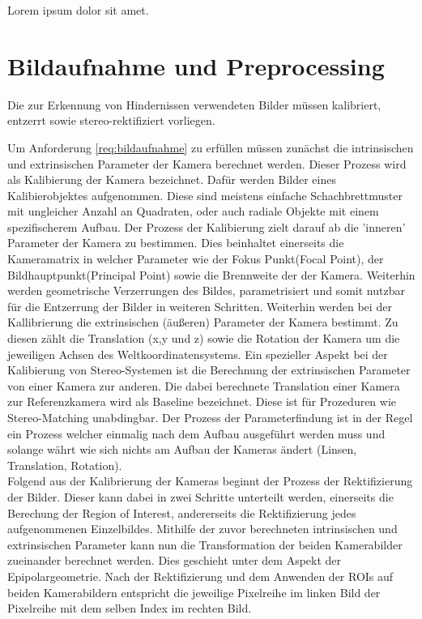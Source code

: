 Lorem ipsum dolor sit amet.

\section{Bildaufnahme und Preprocessing}
\label{sec:bildaufnahme_preprocessing}

	\begin{anforderung}
	\label{req:bildaufnahme}
		Die zur Erkennung von Hindernissen verwendeten Bilder müssen kalibriert, entzerrt sowie stereo-rektifiziert vorliegen.
	\end{anforderung}

\noindent
Um Anforderung \ref{req:bildaufnahme} zu erfüllen müssen zunächst die intrinsischen und extrinsischen Parameter der Kamera berechnet werden. Dieser Prozess wird als Kalibierung der Kamera bezeichnet. Dafür werden Bilder eines Kalibierobjektes aufgenommen. Diese sind meistens einfache Schachbrettmuster mit ungleicher Anzahl an Quadraten, oder auch radiale Objekte mit einem spezifischerem Aufbau. Der Prozess der Kalibierung zielt darauf ab die 'inneren' Parameter der Kamera zu bestimmen. Dies beinhaltet einerseits die Kameramatrix in welcher Parameter wie der Fokus Punkt(Focal Point), der Bildhauptpunkt(Principal Point) sowie die Brennweite der der Kamera. Weiterhin werden geometrische Verzerrungen des Bildes,  parametrisiert und somit nutzbar für die Entzerrung der Bilder in weiteren Schritten. Weiterhin werden bei der Kallibrierung die extrinsischen (äußeren) Parameter der Kamera bestimmt. Zu diesen zählt die Translation (x,y und z) sowie die Rotation der Kamera um die jeweiligen Achsen des Weltkoordinatensystems. Ein spezieller Aspekt bei der Kalibierung von Stereo-Systemen ist die Berechnung der extrinsischen Parameter von einer Kamera zur anderen. Die dabei berechnete Translation einer Kamera zur Referenzkamera wird als Baseline bezeichnet. Diese ist für Prozeduren wie Stereo-Matching unabdingbar. Der Prozess der Parameterfindung ist in der Regel ein Prozess welcher einmalig nach dem Aufbau ausgeführt werden muss und solange währt wie sich nichts am Aufbau der Kameras ändert (Linsen, Translation, Rotation).\\

\noindent
Folgend aus der Kalibrierung der Kameras beginnt der Prozess der Rektifizierung der Bilder. Dieser kann dabei in zwei Schritte unterteilt werden, einerseits die Berechung der Region of Interest, andererseits die Rektifizierung jedes aufgenommenen Einzelbildes. Mithilfe der zuvor berechneten intrinsischen und extrinsischen Parameter kann nun die Transformation der beiden Kamerabilder zueinander berechnet werden. Dies geschieht unter dem Aspekt der Epipolargeometrie. Nach der Rektifizierung und dem Anwenden der ROIs auf beiden Kamerabildern entspricht die jeweilige Pixelreihe im linken Bild der Pixelreihe mit dem selben Index im rechten Bild.\\

